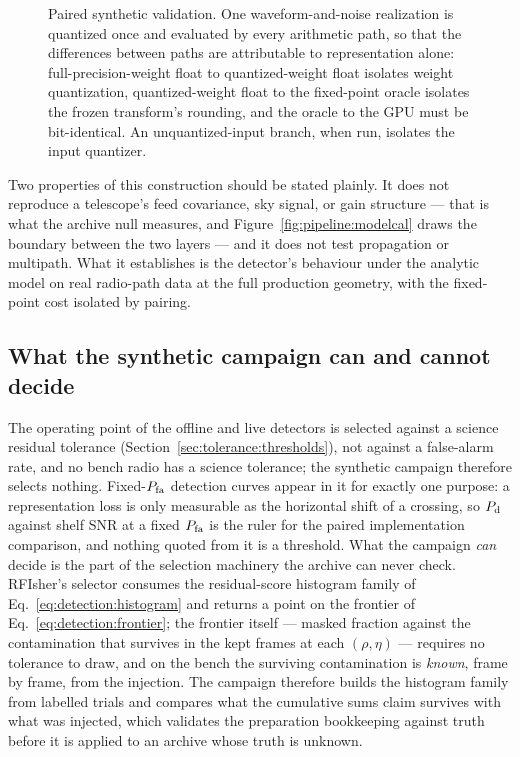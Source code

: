\begin{figure}[H]
\centering
\resizebox{\linewidth}{!}{}
\caption[Paired synthetic validation]{Paired synthetic validation. One waveform-and-noise realization is quantized once and evaluated by every arithmetic path, so that the differences between paths are attributable to representation alone: full-precision-weight float to quantized-weight float isolates weight quantization, quantized-weight float to the fixed-point oracle isolates the frozen transform's rounding, and the oracle to the GPU must be bit-identical. An unquantized-input branch, when run, isolates the input quantizer.}
\label{fig:detection:paired}
\end{figure}

Two properties of this construction should be stated plainly. It does not reproduce a telescope's feed covariance, sky signal, or gain structure --- that is what the archive null measures, and Figure~\ref{fig:pipeline:modelcal} draws the boundary between the two layers --- and it does not test propagation or multipath. What it establishes is the detector's behaviour under the analytic model on real radio-path data at the full production geometry, with the fixed-point cost isolated by pairing.

\subsection*{What the synthetic campaign can and cannot decide}

The operating point of the offline and live detectors is selected against a science residual tolerance (Section~\ref{sec:tolerance:thresholds}), not against a false-alarm rate, and no bench radio has a science tolerance; the synthetic campaign therefore selects nothing. Fixed-$P_{\rm fa}$ detection curves appear in it for exactly one purpose: a representation loss is only measurable as the horizontal shift of a crossing, so $P_{\rm d}$ against shelf SNR at a fixed $P_{\rm fa}$ is the ruler for the paired implementation comparison, and nothing quoted from it is a threshold. What the campaign \emph{can} decide is the part of the selection machinery the archive can never check. RFIsher's selector consumes the residual-score histogram family of Eq.~\eqref{eq:detection:histogram} and returns a point on the frontier of Eq.~\eqref{eq:detection:frontier}; the frontier itself --- masked fraction against the contamination that survives in the kept frames at each $(\rho,\eta)$ --- requires no tolerance to draw, and on the bench the surviving contamination is \emph{known}, frame by frame, from the injection. The campaign therefore builds the histogram family from labelled trials and compares what the cumulative sums claim survives with what was injected, which validates the preparation bookkeeping against truth before it is applied to an archive whose truth is unknown.


